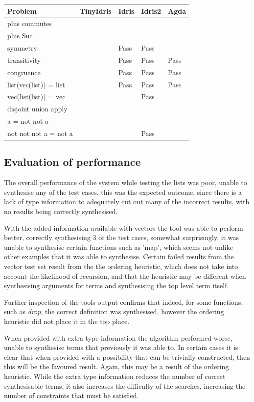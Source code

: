 \documentclass[a4paper]{article}
\begin{document}
\begin{center}
\begin{tabular}{lllll}
Problem & TinyIdris & Idris & Idris2 & Agda\\
\hline
plus commutes &   &   &   &  \\
plus Suc &   &   &   &  \\
symmetry &   & Pass & Pass &  \\
transitivity &   & Pass & Pass & Pass\\
congruence &   & Pass & Pass & Pass\\
list(vec(list)) = list &   & Pass & Pass & Pass\\
vec(list(list)) = vec &   &   & Pass &  \\
disjoint union apply &   &   &   &  \\
a = not not a &   &   &   &  \\
not not not a = not a &   &   & Pass &  \\
\end{tabular}
\end{center}

\subsection{Evaluation of performance}
\label{sec:org4c9aa94}
The overall performance of the system while testing 
the lists was poor, unable to synthesise any of the 
test cases, this was the expected outcome, since
there is a lack of type information to adequately cut out 
many of the incorrect results, with no results being correctly 
synthesised. 

With the added information available with vectors the tool was 
able to perform better, correctly synthesising 3 of the test cases,
somewhat surprisingly, it was unable to synthesise certain functions
such as 'map', which seems not unlike other examples that it was able 
to synthesise. Certain failed results from the vector test set result
from the the ordering heuristic, which does not take into account the
likelihood of recursion, and that the heuristic may be different
when synthesising arguments for terms and synthesising the top level
term itself.

Further inspection of the tools output confirms that indeed, for some
functions, such as \textit{drop}, the correct definition was
synthesised, however the ordering heuristic did not place it in the
top place. 

When provided with extra  type information the algorithm performed
worse, unable to synthesise terms that previously it was able to.
In certain cases it is clear that when provided with a possibility
that can be trivially constructed, then this will be the favoured
result. Again, this may be a result of the ordering heuristic.
While the extra type information reduces the number of correct 
synthesisable terms, it also increases the difficulty of the 
searches, increasing the number of constraints that must be satisfied. 
\end{document}
